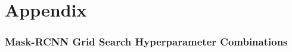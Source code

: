 \renewcommand{\thesubsection}{\Alph{subsection}} %
\titleformat{\chapter}[display]
{\normalfont\huge\bfseries}{\chaptertitlename\ \thechapter}{20pt}{\Huge} %

\titlespacing*{\chapter}{0pt}{0pt}{20pt}
\chapter{Appendix} 
\titlespacing*{\chapter}{0pt}{50pt}{40pt}

\setcounter{subsection}{0} %

\subsection{Mask-RCNN Grid Search Hyperparameter Combinations} \label{app:MaskRCNNHyperparamTuningGridSearch}

